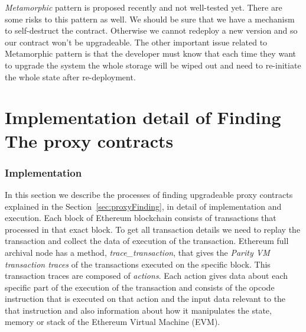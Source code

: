 \textit{Metamorphic} pattern is proposed recently and not well-tested yet. There are some risks to this pattern as well. We should be sure that we have a mechanism to self-destruct the contract. Otherwise we cannot redeploy a new version and so our contract won't be upgradeable. The other important issue related to Metamorphic pattern is that the developer must know that each time they want to upgrade the system the whole storage will be wiped out and need to re-initiate the whole state after re-deployment. 


\clearpage 

\section{Implementation detail of Finding The proxy contracts}

\subsubsection{Implementation}\label{findingProxies}
In this section we describe the processes of finding upgradeable proxy contracts explained in the Section~\ref{sec:proxyFinding}, in detail of implementation and execution. 
Each block of Ethereum blockchain consists of transactions that processed in that exact block. To get all transaction details we need to replay the transaction and collect the data of execution of the transaction. Ethereum full archival node has a method, \textit{trace\_transaction}, that gives the \textit{Parity VM transaction traces} of the transactions executed on the specific block. This transaction traces are composed of \textit{actions}. Each action gives data about each specific part of the execution of the transaction and consists of the opcode instruction that is executed on that action and the input data relevant to the that instruction and also information about how it manipulates the state, memory or stack of the Ethereum Virtual Machine (EVM). 

